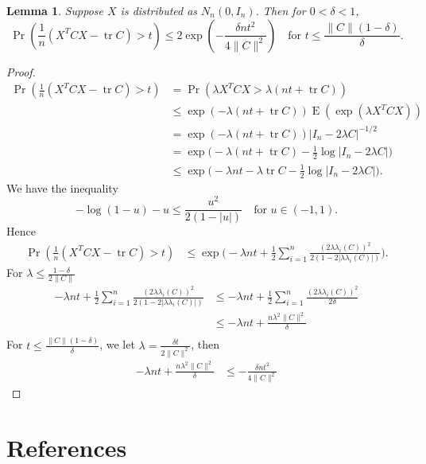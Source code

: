 \documentclass[11pt]{article}
\DeclareMathOperator{\mytr}{tr}
\DeclareMathOperator{\myE}{E}
\theoremstyle{plain}
\newtheorem{lemma}{\quad\quad Lemma}
\theoremstyle{definition}
\theoremstyle{remark}
\begin{document}
\begin{lemma}
    Suppose $X$ is distributed as $N_n(0,I_n)$. Then for $0<\delta <1$,
    $$
        \Pr(\frac{1}{n}(X^T C X -\mytr C)>t)
    \leq 2\exp(-\frac{\delta n t^2}{4\|C\|^2})\quad \text{for $t\leq \frac{\|C\|(1-\delta)}{\delta}$}.
    $$
\end{lemma}
\begin{proof}
$$
    \begin{aligned}
        \Pr(\frac{1}{n}(X^T C X -\mytr C)>t) &=
    \Pr(\lambda X^T C X >\lambda(nt+ \mytr C)) \\
        &\leq
    \exp(-\lambda(nt+\mytr C))
        \myE (\exp(\lambda X^T C X))\\
        &=
    \exp(-\lambda(nt+\mytr C))
        |I_n-2\lambda C|^{-1/2}\\
        &=
    \exp\big(-\lambda(nt+\mytr C)
        -\frac{1}{2}\log|I_n-2\lambda C|\big)\\
        &\leq
    \exp\big(-\lambda nt-\lambda\mytr C
        -\frac{1}{2}\log|I_n-2\lambda C|\big).
    \end{aligned}
    $$
We have the inequality
$$
    -\log(1-u)-u\leq \frac{u^2}{2(1-|u|)}\quad \text{for $u\in(-1,1)$}.
$$
Hence
$$
    \begin{aligned}
        \Pr(\frac{1}{n}(X^T C X -\mytr C)>t) &\leq
        \exp\big(-\lambda nt +\frac{1}{2}\sum_{i=1}^n \frac{(2\lambda \lambda_i(C))^2}{2(1-2|\lambda \lambda_i(C)|)}\big).
    \end{aligned}
    $$
    For $\lambda\leq \frac{1-\delta}{2\|C\|}$
    $$
    \begin{aligned}
    -\lambda nt +\frac{1}{2}\sum_{i=1}^n \frac{(2\lambda \lambda_i(C))^2}{2(1-2|\lambda \lambda_i(C)|)}
        &\leq
    -\lambda nt +\frac{1}{2}\sum_{i=1}^n \frac{(2\lambda \lambda_i(C))^2}{2\delta}\\
        &\leq
        -\lambda nt + \frac{n\lambda^2 \|C\|^2}{\delta}\\
    \end{aligned}
    $$
    For $t\leq \frac{\|C\|(1-\delta)}{\delta}$, we let $\lambda=\frac{\delta t}{2\|C\|^2}$, then
    $$
    \begin{aligned}
        -\lambda nt + \frac{n\lambda^2 \|C\|^2}{\delta}
        &\leq
        -\frac{\delta n t^2}{4\|C\|^2}
    \end{aligned}
    $$
\end{proof}
\section*{References}




\end{document}
